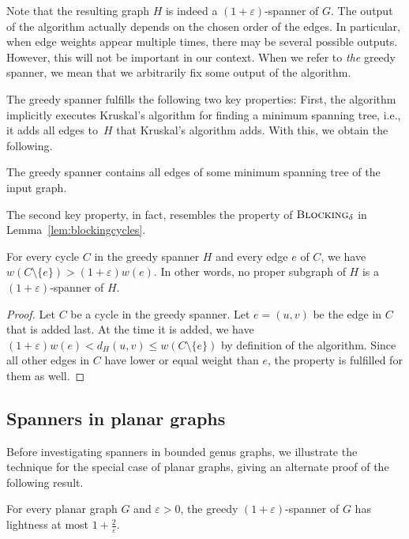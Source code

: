 \documentclass[a4paper,cleveref, autoref, thm-restate, thm-restate, UKenglish]{lipics-v2021}
\newcommand{\blocking}{\textsc{Blocking}}
\renewcommand{\epsilon}{\varepsilon}
\begin{document}
Note that the resulting graph $H$ is indeed a $(1+\epsilon)$-spanner of $G$.
The output of the algorithm actually depends on the chosen order of the edges. 
In particular, when edge weights appear multiple times, there may be several possible outputs. However, this will not be important in our context. 
When we refer to \emph{the} greedy spanner, we mean that we arbitrarily fix some output of the algorithm.


The greedy spanner fulfills the following two key properties: First, the algorithm implicitly executes Kruskal's algorithm for finding a minimum spanning tree, i.e., it adds all edges to~$H$ that Kruskal's algorithm adds. With this, we obtain the following.
\begin{observation}\label{greedyMST}
The greedy spanner contains all edges of some minimum spanning tree of the input graph.
\end{observation}
The second key property, in fact, resembles the property of $\blocking_\delta$ in Lemma~\ref{lem:blockingcycles}.
\begin{observation}\label{obs:longcycle}
For every cycle $C$ in the greedy spanner $H$ and every edge $e$ of $C$, we have $w(C\setminus \{e\})>(1+\epsilon) w(e)$. In other words, no proper subgraph of $H$ is a $(1+\epsilon)$-spanner of $H$.
\end{observation}
\begin{proof}
Let $C$ be a cycle in the greedy spanner. Let $e=(u,v)$ be the edge in $C$ that is added last. At the time it is added, we have $(1+\epsilon)w(e)<d_H(u,v)\leq w(C\setminus \{e\})$ by definition of the algorithm. Since all other edges in $C$ have lower or equal weight than $e$, the property is fulfilled for them as well.
\end{proof}

\subsection{Spanners in planar graphs}\label{sec:planar}

Before investigating spanners in bounded genus graphs, we illustrate the technique for the special case of planar graphs, giving an alternate proof of the following result. 
\begin{theorem}\label{thm:planarspanner}
For every planar graph $G$ and $\epsilon >0$, the greedy $(1+\epsilon)$-spanner of $G$ has lightness at most $1+\frac{2}{\epsilon}$.
\end{theorem}
\end{document}
